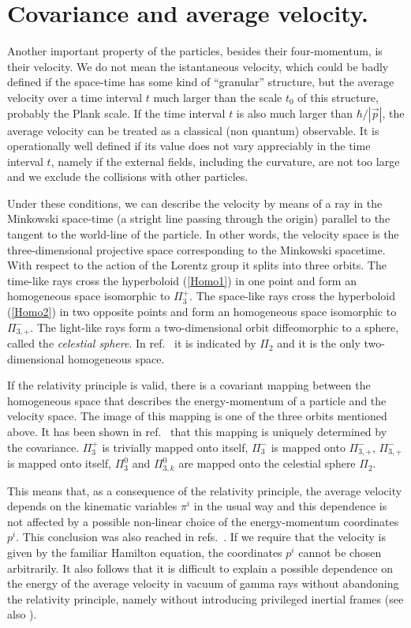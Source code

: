 \documentclass[a4paper,12pt]{article}
\begin{document}
\section{Covariance and average velocity.}

Another important property of the particles, besides their four-momentum, is their velocity. We do not mean the istantaneous velocity, which could be badly defined if the space-time has some kind of ``granular'' structure, but the average velocity over a time interval $t$ much larger than the scale $t_0$ of this structure, probably the Plank scale. If the time interval $t$ is also much larger than $\hbar / |\vec p|$, the average velocity can be treated as a classical (non quantum) observable. It is operationally well defined if its value does not vary appreciably in the time interval $t$, namely if the external fields, including the curvature, are not too large and we exclude the collisions with other particles.

Under these conditions, we can describe the velocity by means of a ray in the Minkowski space-time (a stright line passing through the origin) parallel to the tangent to the world-line of the particle. In other words, the velocity space is the three-dimensional projective space corresponding to the Minkowski spacetime. With respect to the action of the Lorentz group it splits into three orbits. The time-like rays cross the hyperboloid (\ref{Homo1}) in one point and form an homogeneous space isomorphic to $\Pi_3^+$. The space-like rays cross the hyperboloid (\ref{Homo2}) in two opposite points and form an homogeneous space isomorphic to $\Pi_{3,+}^-$. The light-like rays form a two-dimensional orbit diffeomorphic to a sphere, called the {\it celestial sphere}. In ref.\ \cite{Toller1} it is indicated by $\Pi_2$ and it is the only two-dimensional homogeneous space.

If the relativity principle is valid, there is a covariant mapping between the homogeneous space that describes the energy-momentum of a particle and the velocity space. The image of this mapping is one of the three orbits mentioned above. It has been shown in ref.\ \cite{Toller1} that this mapping is uniquely determined by the covariance. $\Pi_3^+$ is trivially mapped onto itself, $\Pi_3^-$ is mapped onto $\Pi_{3,+}^-$, $\Pi_{3,+}^-$ is mapped onto itself, $\Pi_3^0$ and $\Pi_{3,k}^0$ are mapped onto the celestial sphere  $\Pi_2$. 

This means that, as a consequence of the relativity principle, the average velocity depends on the kinematic variables $\pi^i$ in the usual way and this dependence is not affected by a possible non-linear choice of the energy-momentum coordinates $p^i$. This conclusion was also reached in refs.\ \cite{KM,KR}. If we require that the velocity is given by the familiar Hamilton equation, the coordinates $p^i$ cannot be chosen arbitrarily. It also follows that it is difficult to explain a possible dependence on the energy of the average velocity in vacuum of gamma rays without abandoning the relativity principle, namely without introducing privileged inertial frames (see also \cite{LN2,THMT}).
\end{document}
